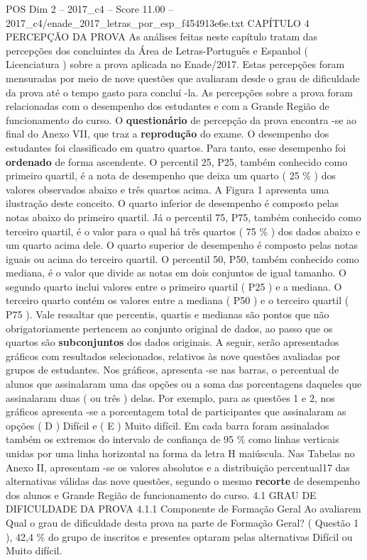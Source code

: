 \begin{textsample}{POS Dim 2 – 2017\_c4 – Score 11.00 – 2017\_c4/enade\_2017\_letras\_por\_esp\_f454913e6e.txt}  \label{ex:f2_pos_094}
CAPÍTULO 4 PERCEPÇÃO DA PROVA As análises feitas neste capítulo tratam das percepções dos concluintes da Área de Letras-Português e Espanhol ( Licenciatura ) sobre a prova aplicada no Enade/2017.
Estas percepções foram mensuradas por meio de nove questões que avaliaram desde o grau de dificuldade da prova até o tempo gasto para concluí -la.
As percepções sobre a prova foram relacionadas com o desempenho dos estudantes e com a Grande Região de funcionamento do curso.
O \textbf{questionário} de percepção da prova encontra -se ao final do Anexo VII, que traz a \textbf{reprodução} do exame.
O desempenho dos estudantes foi classificado em quatro quartos.
Para tanto, esse desempenho foi \textbf{ordenado} de forma ascendente.
O percentil 25, P25, também conhecido como primeiro quartil, é a nota de desempenho que deixa um quarto ( 25 \% ) dos valores observados abaixo e três quartos acima.
A Figura 1 apresenta uma ilustração deste conceito.
O quarto inferior de desempenho é composto pelas notas abaixo do primeiro quartil.
Já o percentil 75, P75, também conhecido como terceiro quartil, é o valor para o qual há três quartos ( 75 \% ) dos dados abaixo e um quarto acima dele.
O quarto superior de desempenho é composto pelas notas iguais ou acima do terceiro quartil.
O percentil 50, P50, também conhecido como mediana, é o valor que divide as notas em dois conjuntos de igual tamanho.
O segundo quarto inclui valores entre o primeiro quartil ( P25 ) e a mediana.
O terceiro quarto contém os valores entre a mediana ( P50 ) e o terceiro quartil ( P75 ).
Vale ressaltar que percentis, quartis e medianas são pontos que não obrigatoriamente pertencem ao conjunto original de dados, ao passo que os quartos são \textbf{subconjuntos} dos dados originais.
A seguir, serão apresentados gráficos com resultados selecionados, relativos às nove questões avaliadas por grupos de estudantes.
Nos gráficos, apresenta -se nas barras, o percentual de alunos que assinalaram uma das opções ou a soma das porcentagens daqueles que assinalaram duas ( ou três ) delas.
Por exemplo, para as questões 1 e 2, nos gráficos apresenta -se a porcentagem total de participantes que assinalaram as opções ( D ) Difícil e ( E ) Muito difícil.
Em cada barra foram assinalados também os extremos do intervalo de confiança de 95 \% como linhas verticais unidas por uma linha horizontal na forma da letra H maiúscula.
Nas Tabelas no Anexo II, apresentam -se os valores absolutos e a distribuição percentual17 das alternativas válidas das nove questões, segundo o mesmo \textbf{recorte} de desempenho dos alunos e Grande Região de funcionamento do curso. 4.1 GRAU DE DIFICULDADE DA PROVA 4.1.1 Componente de Formação Geral Ao avaliarem Qual o grau de dificuldade desta prova na parte de Formação Geral? ( Questão 1 ), 42,4 \% do grupo de inscritos e presentes optaram pelas alternativas Difícil ou Muito difícil.

\end{textsample}
